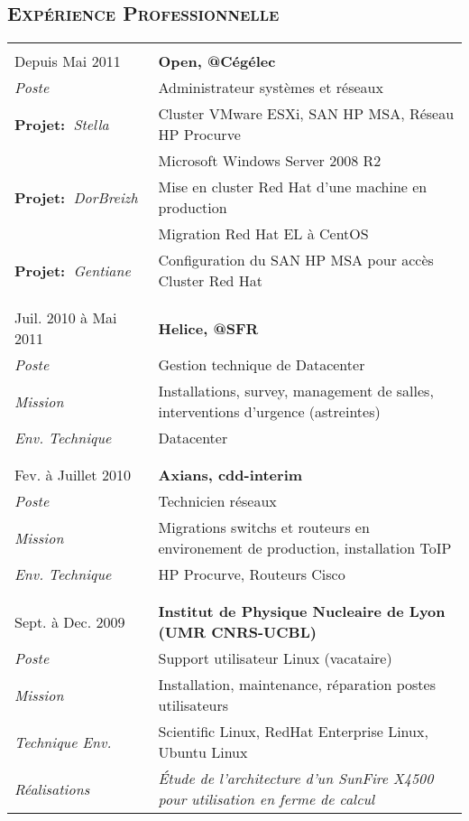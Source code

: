 \documentclass[a4paper,8pt]{article}
\newcommand{\hsubsection}[1]{\subsection*{\fontfamily{phv}\selectfont\textsc{#1}}}
\begin{document}
\hsubsection{Expérience Professionnelle}
\begin{tabular}{P{3.5cm}|p{13cm}}
 & \\
Depuis Mai 2011     & \textbf{Open, @Cégélec}\\
\textsl{Poste}      & Administrateur systèmes et réseaux\\
\textbf{Projet:~}\textit{Stella}     & Cluster VMware ESXi, SAN HP MSA, Réseau HP Procurve \\
                    & Microsoft Windows Server 2008 R2\\
\textbf{Projet:~}\textit{DorBreizh}  & Mise en cluster Red Hat d'une machine en production\\
                    & Migration Red Hat EL à CentOS\\
\textbf{Projet:~}\textit{Gentiane}   & Configuration du SAN HP MSA pour accès Cluster Red Hat\\
 & \\
 & \\
Juil. 2010	à Mai 2011	& \textbf{Helice, @SFR}\\
\textsl{Poste}			& Gestion technique de Datacenter\\
\textsl{Mission}		& Installations, survey, management de salles, interventions d'urgence (astreintes)\\
\textsl{Env. Technique}		& Datacenter\\
 & \\
 & \\
Fev. à Juillet 2010		& \textbf{Axians, cdd-interim}\\
\textsl{Poste}	 		& Technicien réseaux\\
\textsl{Mission}		& Migrations switchs et routeurs en environement de production, installation ToIP\\
\textsl{Env. Technique}		& HP Procurve, Routeurs Cisco\\
 & \\
 & \\
Sept. à Dec. 2009		& \textbf{Institut de Physique Nucleaire de Lyon (UMR CNRS-UCBL)}\\
\textsl{Poste}	 		& Support utilisateur Linux (vacataire)\\
\textsl{Mission} 		& Installation, maintenance, réparation postes utilisateurs\\
\textsl{Technique Env.} 	& Scientific Linux, RedHat Enterprise Linux, Ubuntu Linux\\
\textsl{Réalisations}		& \textsl{\'{E}tude de l'architecture d'un SunFire X4500 pour utilisation en ferme de calcul}\\

\end{tabular}
\end{document}
